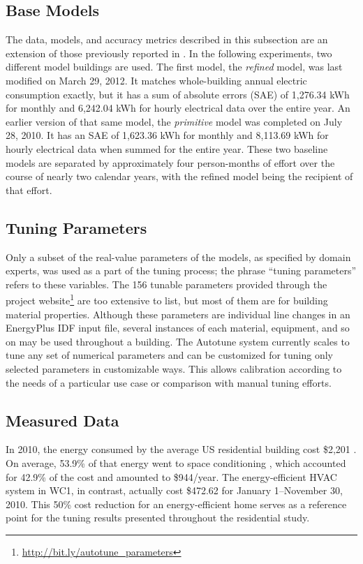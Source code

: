 \documentclass[preprint, review, 12pt]{elsarticle}
\begin{document}
\subsection{Base Models}
The data, models, and accuracy metrics described in this subsection are an extension of those previously reported in \cite{cit:garrett2013}. In the following experiments, two different model buildings are used. The first model, the \emph{refined} model, was last modified on March 29, 2012. It matches whole-building annual electric consumption exactly, but it has a sum of absolute errors (SAE) of 1,276.34 kWh for monthly and 6,242.04 kWh for hourly electrical data over the entire year. An earlier version of that same model, the \emph{primitive} model was completed on July 28, 2010. It has an SAE of 1,623.36 kWh for monthly and 8,113.69 kWh for hourly electrical data when summed for the entire year. These two baseline models are separated by approximately four person-months of effort over the course of nearly two calendar years, with the refined model being the recipient of that effort.

\subsection{Tuning Parameters}
Only a subset of the real-value parameters of the models, as specified by domain experts, was used as a part of the tuning process; the phrase ``tuning parameters'' refers to these variables. The 156 tunable parameters provided through the project website\footnote{\url{http://bit.ly/autotune_parameters}} are too extensive to list, but most of them are for building material properties. Although these parameters are individual line changes in an EnergyPlus IDF input file, several instances of each material, equipment, and so on may be used throughout a building. The Autotune system currently scales to tune any set of numerical parameters and can be customized for tuning only selected parameters in customizable ways. This allows calibration according to the needs of a particular use case or comparison with manual tuning efforts.

\subsection{Measured Data}
In 2010, the energy consumed by the average US residential building cost \$2,201 \cite{cit:doe2012a}. On average, 53.9\% of that energy went to space conditioning \cite{cit:doe2012b}, which accounted for 42.9\% of the cost and amounted to \$944/year. The energy-efficient HVAC system in WC1, in contrast, actually cost \$472.62 for January 1--November 30, 2010. This 50\% cost reduction for an energy-efficient home serves as a reference point for the tuning results presented throughout the residential study.
\end{document}
